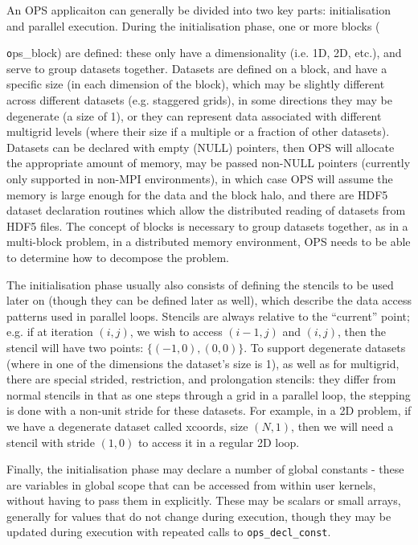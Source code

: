 \documentclass[11pt]{article}
\begin{document}
An OPS applicaiton can generally be divided into two key parts: initialisation and parallel execution. During the 
initialisation phase, one or more blocks ({\texttt ops\_block) are defined: these only have a dimensionality (i.e. 1D, 2D,
etc.), and serve to group datasets together. Datasets are defined on a block, and have a specific size (in each dimension of the block), which may be
slightly different across different datasets (e.g. staggered grids), in some directions they may be degenerate (a
 size of 1), or they can represent data associated with different multigrid levels (where their size if a multiple or
a fraction of other datasets). Datasets can be declared with empty (NULL) pointers, then OPS will allocate the appropriate
amount of memory, may be passed non-NULL pointers (currently only supported in non-MPI environments), in which case OPS will
assume the memory is large enough for the data and the block halo, and there are HDF5 dataset declaration routines which
allow the distributed reading of datasets from HDF5 files. The concept of blocks is necessary to group datasets together, 
as in a multi-block problem, in a distributed memory environment, OPS needs to be able to determine how to decompose the problem.

The initialisation phase usually also consists of defining the stencils to be used later on (though they can be defined later as well),
which describe the data access patterns used in parallel loops. Stencils are always relative to the ``current'' point; e.g. if
at iteration $(i,j)$, we wish to access $(i{-}1,j)$ and $(i,j)$, then the stencil will have two points: $\{(-1, 0), (0, 0)\}$. To 
support degenerate datasets (where in one of the dimensions the dataset's size is 1), as well as for multigrid, there are
special strided, restriction, and prolongation stencils: they differ from normal stencils in that as one steps through a
grid in a parallel loop, the stepping is done with a non-unit stride for these datasets. For example, in a 2D problem, if
we have a degenerate dataset called xcoords, size $(N,1)$, then we will need a stencil with stride $(1,0)$ to access it in a
regular 2D loop.

Finally, the initialisation phase may declare a number of global constants - these are variables in global scope that can 
be accessed from within user kernels, without having to pass them in explicitly. These may be scalars or small arrays, 
generally for values that do not change during execution, though they may be updated during execution with repeated calls
to {\tt ops\_decl\_const}. 

}
\end{document}

